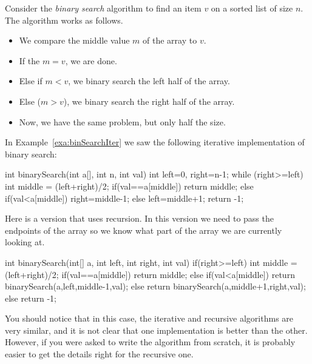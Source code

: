 \begin{exa}\label{exa:binSearchComp}
Consider the {\em binary search} algorithm to find an item $v$ on a sorted list of size $n$.
The algorithm works as follows. 
\begin{itemize}
\item We compare the middle value $m$ of the array to $v$.
\item If the $m=v$, we are done.
\item Else if $m<v$, we binary search the left half of the array.
\item Else ($m>v$), we binary search the right half of the array.
\item Now, we have the same problem, but only half the size.
\end{itemize}
In Example~\ref{exa:binSearchIter} we saw the following iterative implementation of
binary search:
\begin{code}
    int binarySearch(int a[], int n, int val) {
       int left=0, right=n-1;
       while (right>=left) {
           int middle = (left+right)/2;
           if(val==a[middle]) 
               return middle;
           else if(val<a[middle]) 
               right=middle-1;
           else 
               left=middle+1; 
        }
       return -1;
    }
\end{code} 
Here is a version that uses recursion.  In this version we need to pass the 
endpoints of the array so we know what part of the array we are currently looking at.
\begin{code}
    int binarySearch(int[] a, int left, int right, int val) {
        if(right>=left) {
            int middle = (left+right)/2;
            if(val==a[middle])      
                return middle;
            else if(val<a[middle])  
                return binarySearch(a,left,middle-1,val);
            else                   
                return binarySearch(a,middle+1,right,val);
        } else {
            return -1;
        }
    }
\end{code}
You should notice that in this case, the iterative and recursive algorithms are
very similar, and it is not clear that one implementation is better than the other.
However, if you were asked to write the algorithm from scratch, it is probably easier to
get the details right for the recursive one.
\end{exa}

